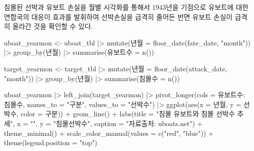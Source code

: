 \documentclass[
  letterpaper,
  chapter,a4paper,showtrims,openright,hidelinks]{oblivoir}
\newenvironment{Shaded}{\begin{snugshade}}{\end{snugshade}}
\newcommand{\AttributeTok}[1]{\textcolor[rgb]{0.40,0.45,0.13}{#1}}
\newcommand{\FunctionTok}[1]{\textcolor[rgb]{0.28,0.35,0.67}{#1}}
\newcommand{\NormalTok}[1]{\textcolor[rgb]{0.00,0.23,0.31}{#1}}
\newcommand{\OtherTok}[1]{\textcolor[rgb]{0.00,0.23,0.31}{#1}}
\newcommand{\SpecialCharTok}[1]{\textcolor[rgb]{0.37,0.37,0.37}{#1}}
\newcommand{\StringTok}[1]{\textcolor[rgb]{0.13,0.47,0.30}{#1}}
\begin{document}
침몰된 선박과 유보트 손실을 월별 시각화를 통해서 1943년을 기점으로
유보트에 대한 연합국의 대응이 효과를 발휘하여 선박손실을 급격히 줄어든
반면 유보트 손실이 급격히 올라간 것을 확인할 수 있다.

\begin{Shaded}
\begin{Highlighting}[]
\NormalTok{uboat\_yearmon }\OtherTok{\textless{}{-}}\NormalTok{ uboat\_tbl }\SpecialCharTok{|\textgreater{}} 
  \FunctionTok{mutate}\NormalTok{(년월 }\OtherTok{=} \FunctionTok{floor\_date}\NormalTok{(fate\_date, }\StringTok{"month"}\NormalTok{)) }\SpecialCharTok{|\textgreater{}} 
  \FunctionTok{group\_by}\NormalTok{(년월) }\SpecialCharTok{|\textgreater{}} 
  \FunctionTok{summarise}\NormalTok{(유보트수 }\OtherTok{=} \FunctionTok{n}\NormalTok{())}

\NormalTok{target\_yearmon }\OtherTok{\textless{}{-}}\NormalTok{ target\_tbl }\SpecialCharTok{|\textgreater{}} 
  \FunctionTok{mutate}\NormalTok{(년월 }\OtherTok{=} \FunctionTok{floor\_date}\NormalTok{(attack\_date, }\StringTok{"month"}\NormalTok{)) }\SpecialCharTok{|\textgreater{}} 
  \FunctionTok{group\_by}\NormalTok{(년월) }\SpecialCharTok{|\textgreater{}} 
  \FunctionTok{summarise}\NormalTok{(침몰수 }\OtherTok{=} \FunctionTok{n}\NormalTok{()) }

\NormalTok{uboat\_yearmon }\SpecialCharTok{|\textgreater{}} 
  \FunctionTok{left\_join}\NormalTok{(target\_yearmon) }\SpecialCharTok{|\textgreater{}} 
  \FunctionTok{pivot\_longer}\NormalTok{(}\AttributeTok{cols =}\NormalTok{ 유보트수}\SpecialCharTok{:}\NormalTok{침몰수, }\AttributeTok{names\_to =} \StringTok{"구분"}\NormalTok{, }\AttributeTok{values\_to =} \StringTok{"선박수"}\NormalTok{) }\SpecialCharTok{|\textgreater{}} 
  \FunctionTok{ggplot}\NormalTok{(}\FunctionTok{aes}\NormalTok{(}\AttributeTok{x =}\NormalTok{ 년월, }\AttributeTok{y =}\NormalTok{ 선박수, }\AttributeTok{color =}\NormalTok{ 구분)) }\SpecialCharTok{+}
    \FunctionTok{geom\_line}\NormalTok{() }\SpecialCharTok{+}
    \FunctionTok{labs}\NormalTok{(}\AttributeTok{title =} \StringTok{"침몰 유보트와 침몰 선박수 추세"}\NormalTok{,}
         \AttributeTok{x =} \StringTok{""}\NormalTok{,}
         \AttributeTok{y =} \StringTok{"침몰선박수"}\NormalTok{,}
         \AttributeTok{caption =} \StringTok{"자료출처: uboats.net"}\NormalTok{) }\SpecialCharTok{+}
    \FunctionTok{theme\_minimal}\NormalTok{() }\SpecialCharTok{+}
    \FunctionTok{scale\_color\_manual}\NormalTok{(}\AttributeTok{values =} \FunctionTok{c}\NormalTok{(}\StringTok{"red"}\NormalTok{, }\StringTok{"blue"}\NormalTok{)) }\SpecialCharTok{+}
    \FunctionTok{theme}\NormalTok{(}\AttributeTok{legend.position =} \StringTok{"top"}\NormalTok{)}
\end{Highlighting}
\end{Shaded}
\end{document}

